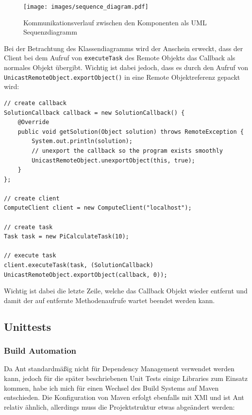 \begin{figure}[H]
	\begin{center}
		\texttt{[image: images/sequence\_diagram.pdf]}
		\caption{Kommunikationsverlauf zwischen den Komponenten als UML Sequenzdiagramm}
		\label{broker}
	\end{center}
\end{figure}

Bei der Betrachtung des Klassendiagramms wird der Anschein erweckt, dass der Client bei dem Aufruf von \texttt{executeTask} des Remote Objekts das Callback als normales Objekt \"ubergibt.
Wichtig ist dabei jedoch, dass es durch den Aufruf von \texttt{UnicastRemoteObject.exportObject()} in eine Remote Objektreferenz gepackt wird:

\begin{lstlisting}[style=Java, caption=Beispielcode zur asynchronen Ausf\"uhrung einer Berechnung.]
// create callback
SolutionCallback callback = new SolutionCallback() {
    @Override
    public void getSolution(Object solution) throws RemoteException {
        System.out.println(solution);
        // unexport the callback so the program exists smoothly
        UnicastRemoteObject.unexportObject(this, true);
    }
};

// create client
ComputeClient client = new ComputeClient("localhost");

// create task
Task task = new PiCalculateTask(10);

// execute task
client.executeTask(task, (SolutionCallback) UnicastRemoteObject.exportObject(callback, 0));
\end{lstlisting}

Wichtig ist dabei die letzte Zeile, welche das Callback Objekt wieder entfernt und damit der auf entfernte Methodenaufrufe wartet beendet werden kann.

\subsection{Unittests}
\subsubsection{Build Automation}
Da Ant standardm\"a\ss ig nicht f\"ur Dependency Management verwendet werden kann, jedoch f\"ur die sp\"ater beschriebenen Unit Tests einige Libraries zum Einsatz kommen, habe ich mich f\"ur einen Wechsel des Build Systems auf Maven entschieden.
Die Konfiguration von Maven erfolgt ebenfalls mit XMl und ist Ant relativ \"ahnlich, allerdings muss die Projektstruktur etwas abge\"andert werden:

